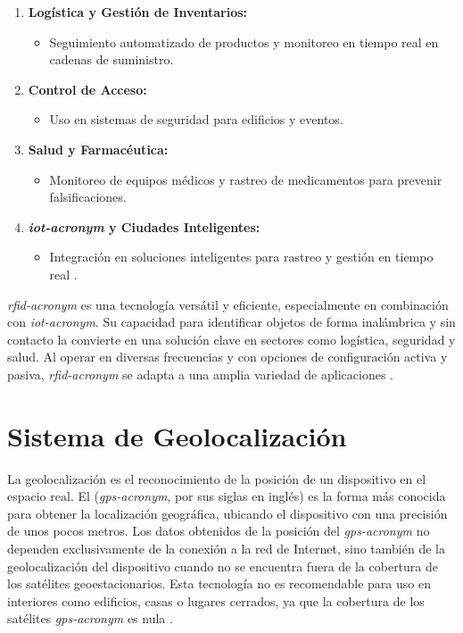 \begin{enumerate}
    \item \textbf{Logística y Gestión de Inventarios:}
    \begin{itemize}
        \item Seguimiento automatizado de productos y monitoreo en tiempo real en cadenas de suministro.
    \end{itemize}
    \item \textbf{Control de Acceso:}
    \begin{itemize}
        \item Uso en sistemas de seguridad para edificios y eventos.
    \end{itemize}
    \item \textbf{Salud y Farmacéutica:}
    \begin{itemize}
        \item Monitoreo de equipos médicos y rastreo de medicamentos para prevenir falsificaciones.
    \end{itemize}
    \item \textbf{\textit{\acrshort{iot-acronym}} y Ciudades Inteligentes:}
    \begin{itemize}
        \item Integración en soluciones inteligentes para rastreo y gestión en tiempo real \cite{Mechanismiot, 8550722}.
    \end{itemize}
\end{enumerate}

\textit{\acrshort{rfid-acronym}} es una tecnología versátil y eficiente, especialmente en combinación con \textit{\acrshort{iot-acronym}}. Su capacidad para identificar objetos de forma inalámbrica y sin contacto la convierte en una solución clave en sectores como logística, seguridad y salud. Al operar en diversas frecuencias y con opciones de configuración activa y pasiva, \textit{\acrshort{rfid-acronym}} se adapta a una amplia variedad de aplicaciones \cite{8550722, RFidtech}.

  

\section{Sistema de Geolocalización}

La geolocalización es el reconocimiento de la posición de un dispositivo en el espacio real. El  (\textit{\gls{gps-acronym}}, por sus siglas en inglés) es la forma más conocida para obtener la localización geográfica, ubicando el dispositivo con una precisión de unos pocos metros. Los datos obtenidos de la posición del \textit{\acrshort{gps-acronym}} no dependen exclusivamente de la conexión a la red de Internet, sino también de la geolocalización del dispositivo cuando no se encuentra fuera de la cobertura de los satélites geoestacionarios. Esta tecnología no es recomendable para uso en interiores como edificios, casas o lugares cerrados, ya que la cobertura de los satélites \textit{\acrshort{gps-acronym}} es nula \cite{fombona2017posibilidades, benavides2021implementacion}.


